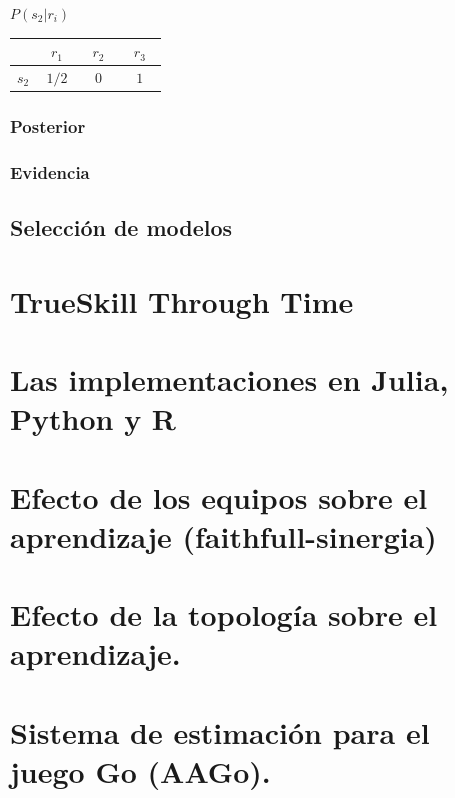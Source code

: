 \documentclass[a4paper,10pt]{book}
\theoremstyle{definition}
\begin{document}
\begin{table}[H]
\centering
 $P(s_2|r_i)$   
 
 \begin{tabular}{c|c|c|c} \setlength\tabcolsep{0.4cm} 
          & \, $r_1$ \, &  \, $r_2$ \, & \, $r_3$ \, \\ \hline 
   $s_2$ & $1/2$ & $0$ & $1$  \\ \hline
\end{tabular}
\end{table}

\subsection{Posterior}

\subsection{Evidencia}




\section{Selección de modelos}

\chapter{TrueSkill Through Time}

\chapter{Las implementaciones en Julia, Python y R}

\chapter{Efecto de los equipos sobre el aprendizaje (faithfull-sinergia)}

\chapter{Efecto de la topología sobre el aprendizaje.}

\chapter{Sistema de estimación para el juego Go (AAGo).}
\end{document}
